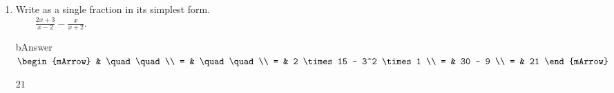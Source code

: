 \begin{enumerate}
  \item \begin{exercise} Write as a single fraction in its simplest form. \\
                               $ \quad\quad \frac{2x+3}{x-2} - \frac{x}{x+2}  $. 
        \begin{envOut}[height=11cm]{bAnswer}
		     $\begin{mArrow}
		        & \quad\quad                      \\ 
              = & \quad\quad      \\ 
              = & 2 \times 15 - 3^2 \times 1     \\ 
              = & 30 - 9                       \\
              = & 21						  
	         \end{mArrow}$
        \end{envOut}			  
	    \begin{shortsolution}$21$\end{shortsolution}
	  \end{exercise}
\end{enumerate}

